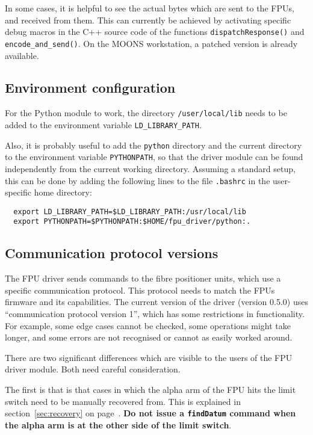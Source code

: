 \documentclass{scrartcl}[12pt,a4paper]
\begin{document}
In some cases, it is helpful to see the actual bytes which are sent to
the FPUs, and received from them. This can currently be achieved by
activating specific debug macros in the C++ source code of the
functions \texttt{dispatchResponse()} and
\texttt{encode\_and\_send()}. On the MOONS workstation, a patched
version is already available.


\subsection{Environment configuration}

For the Python module to work, the directory \texttt{/user/local/lib}
needs to be added to the environment variable
\texttt{LD\_LIBRARY\_PATH}.

Also, it is probably useful to add the \texttt{python} directory and
the current directory to the environment variable \texttt{PYTHONPATH},
so that the driver module can be found independently from the current
working directory.  Assuming a standard setup, this can be done by
adding the following lines to the file \texttt{.bashrc} in the
user-specific home directory:

\begin{verbatim}
  export LD_LIBRARY_PATH=$LD_LIBRARY_PATH:/usr/local/lib
  export PYTHONPATH=$PYTHONPATH:$HOME/fpu_driver/python:.
\end{verbatim}





\subsection{Communication protocol versions}

The FPU driver sends commands to the fibre positioner units, which use
a specific communication protocol. This protocol needs to match the
FPUs firmware and its capabilities. The current version of the driver
(version 0.5.0) uses ``communication protocol version 1'', which has
some restrictions in functionality. For example, some edge cases
cannot be checked, some operations might take longer, and some errors
are not recognised or cannot as easily worked around.

There are two significant differences which are visible to the users
of the FPU driver module. Both need careful consideration.

The first is that is that cases in which the alpha arm of the FPU hits
the limit switch need to be manually recovered from. This is explained
in section~\ref{sec:recovery} on page~\pageref{sec:recovery}.
\textbf{Do not issue a \texttt{findDatum} command when the alpha arm
  is at the other side of the limit switch}.
\end{document}

